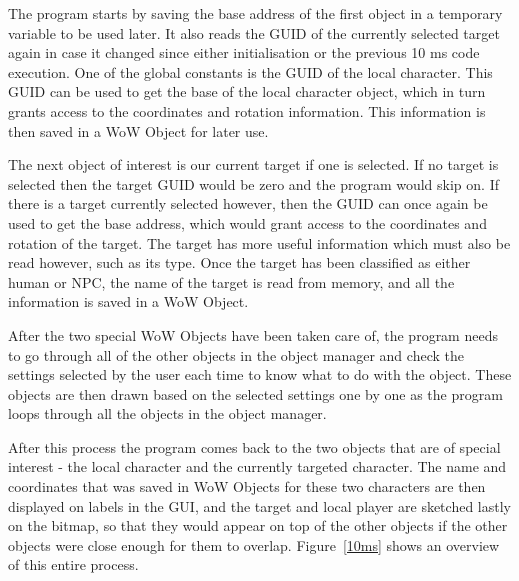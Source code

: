 The program starts by saving the base address of the first object in a temporary variable to be used later. It also reads the GUID of the currently selected target again in case it changed since either initialisation or the previous 10 ms code execution. One of the global constants is the GUID of the local character. This GUID can be used to get the base of the local character object, which in turn grants access to the coordinates and rotation information. This information is then saved in a WoW Object for later use.

The next object of interest is our current target if one is selected. If no target is selected then the target GUID would be zero and the program would skip on. If there is a target currently selected however, then the GUID can once again be used to get the base address, which would grant access to the coordinates and rotation of the target. The target has more useful information which must also be read however, such as its type. Once the target has been classified as either human or NPC, the name of the target is read from memory, and all the information is saved in a WoW Object.

After the two special WoW Objects have been taken care of, the program needs to go through all of the other objects in the object manager and check the settings selected by the user each time to know what to do with the object. These objects are then drawn based on the selected settings one by one as the program loops through all the objects in the object manager.

After this process the program comes back to the two objects that are of special interest - the local character and the currently targeted character. The name and coordinates that was saved in WoW Objects for these two characters are then displayed on labels in the GUI, and the target and local player are sketched lastly on the bitmap, so that they would appear on top of the other objects if the other objects were close enough for them to overlap. Figure~\ref{10ms} shows an overview of this entire process.

